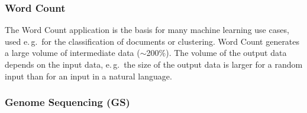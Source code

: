 \documentclass{acm_proc_article-sp}
\newcommand{\jhanote}[1]{ {\textcolor{red} { ***shantenu: #1 }}}
\newcommand{\alnote}[1]{ {\textcolor{blue} { ***andreL: #1 }}}
\newcommand{\alnote}[1]{}
\newcommand{\jhanote}[1]{}
\newcommand{\pilotmapreduce}{Pilot-MapReduce\xspace}
\begin{document}


\subsubsection*{Word Count}

The Word Count application is the basis for many machine learning use cases, 
used e.\,g.\ for the classification of documents or clustering. Word Count 
generates a large volume of intermediate data ($\sim$200$\%$). The volume of the 
output data depends on the input data, e.\,g.\ the size of the output data is 
larger for a random input than for an input in a natural language. 


\subsubsection*{Genome Sequencing (GS)}
\end{document}
